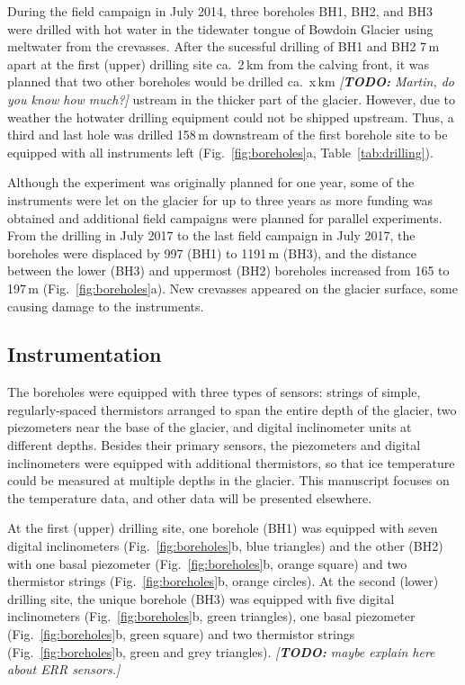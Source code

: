 \documentclass[utf8]{article}
\newcommand{\todo}[1]{\textcolor{c3}{\emph{[\textbf{TODO:} #1]}}}
\begin{document}
    During the field campaign in July 2014, three boreholes BH1, BH2, and BH3
    were drilled with hot water in the tidewater tongue of Bowdoin Glacier
    using meltwater from the crevasses. After the sucessful drilling of BH1
    and BH2 7\,m apart at the first (upper) drilling site ca.~2\,km from the
    calving front, it was planned that two other boreholes would be drilled
    ca.~x\,km \todo{Martin, do you know how much?}
    ustream in the thicker part of the glacier. However, due to weather the
    hotwater drilling equipment could not be shipped upstream. Thus, a third
    and last hole was drilled 158\,m downstream of the first borehole site
    to be equipped with all instruments left (Fig.~\ref{fig:boreholes}a,
    Table~\ref{tab:drilling}).

    Although the experiment was originally planned for one year, some of the
    instruments were let on the glacier for up to three years as more funding
    was obtained and additional field campaigns were planned for parallel
    experiments. From the drilling in July 2017 to the last field campaign in
    July 2017, the boreholes were displaced by 997 (BH1) to 1191\,m (BH3), and
    the distance between the lower (BH3) and uppermost (BH2) boreholes
    increased from 165 to 197\,m (Fig.~\ref{fig:boreholes}a). New crevasses
    appeared on the glacier surface, some causing damage to the instruments.


\subsection{Instrumentation}

    The boreholes were equipped with three types of sensors: strings of simple,
    regularly-spaced thermistors arranged to span the entire depth of the
    glacier, two piezometers near the base of the glacier, and digital
    inclinometer units at different depths. Besides their primary sensors, the
    piezometers and digital inclinometers were equipped with additional
    thermistors, so that ice temperature could be measured at multiple depths
    in the glacier. This manuscript focuses on the temperature data, and other
    data will be presented elsewhere.

    At the first (upper) drilling site, one borehole (BH1) was equipped with
    seven digital inclinometers (Fig.~\ref{fig:boreholes}b, blue triangles) and
    the other (BH2) with one basal piezometer (Fig.~\ref{fig:boreholes}b,
    orange square) and two thermistor strings (Fig.~\ref{fig:boreholes}b,
    orange circles). At the second (lower) drilling site, the unique
    borehole (BH3) was equipped with five digital inclinometers
    (Fig.~\ref{fig:boreholes}b, green triangles), one basal piezometer
    (Fig.~\ref{fig:boreholes}b, green square) and two thermistor strings
    (Fig.~\ref{fig:boreholes}b, green and grey triangles).
    \todo{maybe explain here about ERR sensors.}
\end{document}
